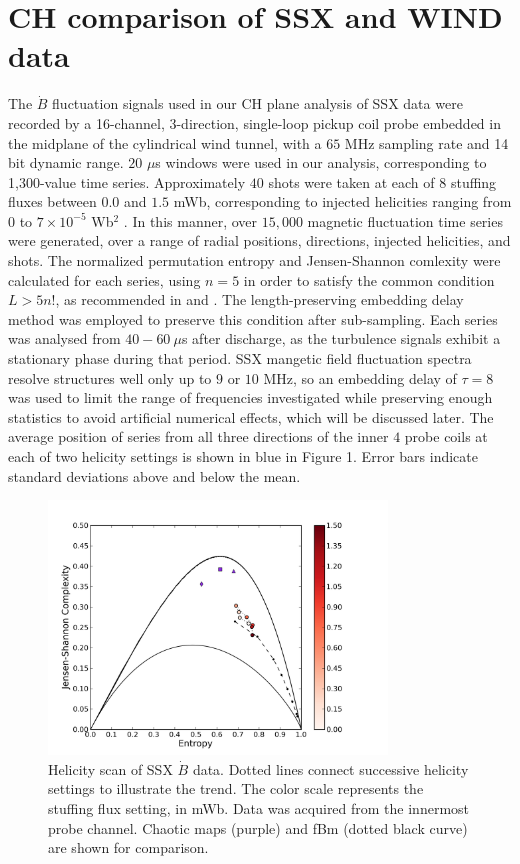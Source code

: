 \documentclass[aps,pre,twocolumn,secnumarabic,nobalancelastpage,amsmath,amssymb,
nofootinbib]{revtex4-1}
\begin{document}
\section{CH comparison of SSX and WIND data}
The $\dot{B}$ fluctuation signals used in our CH plane analysis of SSX data  were recorded by a 16-channel, 3-direction, single-loop pickup coil probe embedded in the midplane of the cylindrical wind tunnel, with a $65$ MHz sampling rate and 14 bit dynamic range. $20$ $\mu$s windows were used in our analysis, corresponding to 1,300-value time series. Approximately $40$ shots were taken at each of $8$ stuffing fluxes between $0.0$ and $1.5$ mWb, corresponding to injected helicities ranging from $0$ to $7 \times 10^{-5}$ Wb$^2$ \cite{schaffner2014}. In this manner, over $15,000$ magnetic fluctuation time series were generated, over a range of radial positions, directions, injected helicities, and shots. The normalized permutation entropy and Jensen-Shannon comlexity were calculated for each series, using $n=5$ in order to satisfy the common condition $L > 5n!$, as recommended in \cite{amigo2008} and \cite{riedl2013}. The length-preserving embedding delay method was employed to preserve this condition after sub-sampling. Each series was analysed from $40-60~\mu$s after discharge, as the turbulence signals exhibit a stationary phase during that period. SSX mangetic field fluctuation spectra resolve structures well only up to $9$ or $10$ MHz, so an embedding delay of $\tau=8$ was used to limit the range of frequencies investigated while preserving enough statistics to avoid artificial numerical effects, which will be discussed later. The average position of series from all three directions of the inner $4$ probe coils at each of two helicity settings is shown in blue in Figure 1. Error bars indicate standard deviations above and below the mean.  

\begin{figure}[!htbp]
\centerline{
\includegraphics[width=9cm]{fig2.png}}
\caption{\label{Figure 2} Helicity scan of SSX $\dot{B}$ data. Dotted lines connect successive helicity settings to illustrate the trend. The color scale represents the stuffing flux setting, in mWb.  Data was acquired from the innermost probe channel. Chaotic maps (purple) and fBm (dotted black curve) are shown for comparison.}
\end{figure}
\end{document}
